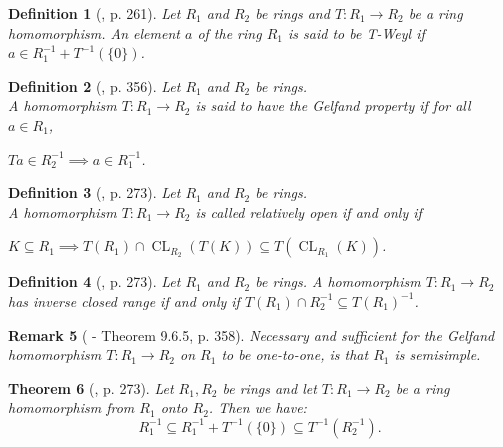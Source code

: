 \documentclass[12pt, oneside]{book}
\newtheorem{theorem}{Theorem}[subsection]
\newtheorem{definition}[theorem]{Definition}
\newtheorem{remark}[theorem]{Remark}
\def\CL{\operatorname{CL}}
\begin{document}
\begin{definition}[\cite{H1}, p. 261] 
\normalfont
\noindent Let $R_1$ and $R_2$ be rings and $T: R_1 \to R_2$ be a ring homomorphism. 
An element $a$ of the ring $R_1$ is said to be {\sl T-Weyl} if $a \in R_1^{-1}+T^{-1}(\{0\})$.
\end{definition}


\begin{definition}[\cite{H1}, p. 356] 
\normalfont
\noindent Let $R_1$ and $R_2$ be rings. \\
A homomorphism $T: R_1 \to R_2$ is said to have the 
{\sl Gelfand property} if for all $a \in R_1$, 
\begin{center}
$Ta \in R_2^{-1} \implies a \in R_1^{-1}$.
\end{center}
\end{definition}

\begin{definition}[\cite{CH3}, p. 273] 
\normalfont
\noindent Let $R_1$ and $R_2$ be rings. \\
A homomorphism $T: R_1 \to R_2$ is called {\sl relatively open} 
if and only if 
\begin{center}
$K \subseteq R_1 \implies T(R_1) \cap \CL_{R_2}(T(K)) \subseteq T(\CL_{R_1}(K))$.
\end{center}

\end{definition}


\begin{definition}[\cite{CH3}, p. 273] 
\normalfont
\noindent Let $R_1$ and $R_2$ be rings. A homomorphism $T: R_1 \to R_2$ has {\sl inverse closed range} 
if and only if $T(R_1) \cap R_2^{-1} \subseteq T(R_1)^{-1}$.
\end{definition}

\begin{remark}[\cite{H1} - Theorem 9.6.5, p. 358] 
\normalfont
\noindent Necessary and sufficient for the Gelfand homomorphism $T: R_1 \to R_2$ on $R_1$ to be 
one-to-one, is that $R_1$ is semisimple.
\end{remark}

\begin{theorem}[\cite{CH3}, p. 273]
\normalfont
\noindent Let $R_1, R_2$ be rings and let $T:R_1 \to R_2$ be a ring homomorphism from $R_1$ onto $R_2$. Then we have: 
\begin{equation} \label{FredholmAndWeyl}
 R_1^{-1} \subseteq R_1^{-1} + T^{-1}(\{0\}) \subseteq T^{-1}(R_2^{-1}).
\end{equation}
\end{theorem}
\end{document}
